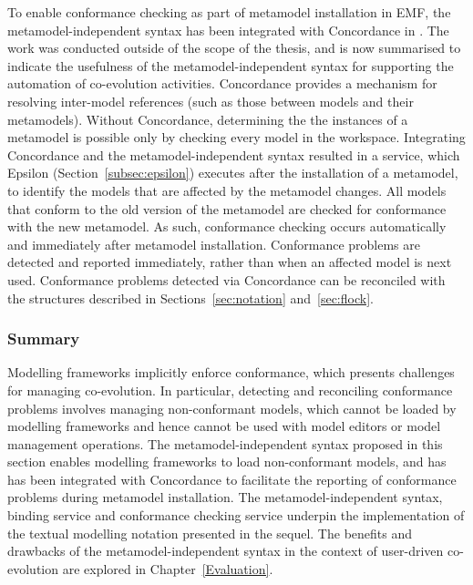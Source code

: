 To enable conformance checking as part of metamodel installation in EMF, the metamodel-independent syntax has been integrated with Concordance in \cite{rose10concordance}. The work was conducted outside of the scope of the thesis, and is now summarised to indicate the usefulness of the metamodel-independent syntax for supporting the automation of co-evolution activities. Concordance provides a mechanism for resolving inter-model references (such as those between models and their metamodels). Without Concordance, determining the the instances of a metamodel is possible only by checking every model in the workspace. Integrating Concordance and the metamodel-independent syntax resulted in a service, which Epsilon (Section~\ref{subsec:epsilon}) executes after the installation of a metamodel, to identify the models that are affected by the metamodel changes. All models that conform to the old version of the metamodel are checked for conformance with the new metamodel. As such, conformance checking occurs automatically and immediately after metamodel installation. Conformance problems are detected and reported immediately, rather than when an affected model is next used. Conformance problems detected via Concordance can be reconciled with the structures described in Sections~\ref{sec:notation} and~\ref{sec:flock}.

\subsubsection{Summary}
Modelling frameworks implicitly enforce conformance, which presents challenges for managing co-evolution. In particular, detecting and reconciling conformance problems involves managing non-conformant models, which cannot be loaded by modelling frameworks and hence cannot be used with model editors or model management operations. The metamodel-independent syntax proposed in this section enables modelling frameworks to load non-conformant models, and has has been integrated with Concordance \cite{rose10concordance} to facilitate the reporting of conformance problems during metamodel installation. The metamodel-independent syntax, binding service and conformance checking service underpin the implementation of the textual modelling notation presented in the sequel. The benefits and drawbacks of the metamodel-independent syntax in the context of user-driven co-evolution are explored in Chapter~\ref{Evaluation}. 
